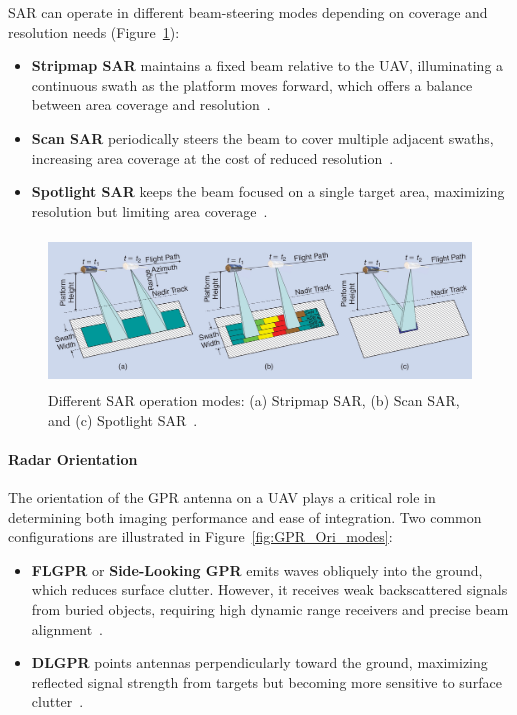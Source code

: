 \gls{SAR} can operate in different beam-steering modes depending on coverage and resolution needs (Figure~\ref{fig:sar_modes}):

\begin{itemize}
    \item \textbf{Stripmap \gls{SAR}} maintains a fixed beam relative to the \gls{UAV}, illuminating a continuous swath as the platform moves forward, which offers a balance between area coverage and resolution~\cite{moreira2013tutorial}.
    \item \textbf{Scan \gls{SAR}} periodically steers the beam to cover multiple adjacent swaths, increasing area coverage at the cost of reduced resolution~\cite{moreira2013tutorial}.
    \item \textbf{Spotlight \gls{SAR}} keeps the beam focused on a single target area, maximizing resolution but limiting area coverage~\cite{moreira2013tutorial}.
\end{itemize}

\begin{figure}[H]
    \centering
    \includegraphics[height=4cm]{figs/Huirui/sar_modes.png}
    \caption{Different \gls{SAR} operation modes: (a) Stripmap SAR, (b) Scan SAR, and (c) Spotlight SAR~\cite{moreira2013tutorial}.}
    \label{fig:sar_modes}
\end{figure}


\paragraph{Radar Orientation}

The orientation of the \gls{GPR} antenna on a \gls{UAV} plays a critical role in determining both imaging performance and ease of integration. Two common configurations are illustrated in Figure~\ref{fig:GPR_Ori_modes}:

\begin{itemize}
    \item \textbf{\gls{FLGPR}} or \textbf{Side-Looking \gls{GPR}} emits waves obliquely into the ground, which reduces surface clutter. However, it receives weak backscattered signals from buried objects, requiring high dynamic range receivers and precise beam alignment~\cite{garcia2020airborne}.

    \item \textbf{\gls{DLGPR}} points antennas perpendicularly toward the ground, maximizing reflected signal strength from targets but becoming more sensitive to surface clutter~\cite{garcia2020airborne}.
\end{itemize}


